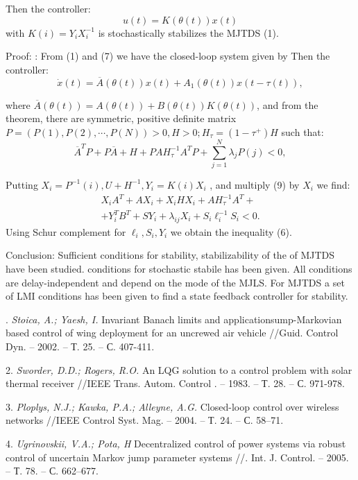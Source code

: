 Then the controller:
\begin{equation}
u(t)=K(\theta(t))x(t)
\end{equation}
with $K(i)=Y_i X_i^{-1}$ is stochastically stabilizes the MJTDS (1).

Proof: : From (1) and (7) we have the closed-loop system given by
Then the controller:
\begin{equation}
\dot{x}(t)=\overline A(\theta(t))x(t) +A_1(\theta(t))x(t-\tau(t)),
\end{equation}

where $\overline A(\theta(t))=A(\theta(t))+B(\theta(t))K(\theta(t))$,  and from the theorem, there are symmetric, positive definite matrix $P=(P(1),P(2),\cdots,P(N))>0 ,H>0; H_\tau =(1-\tau^+)H$ such that:
\begin{equation}
\overline A^TP +P\overline A+H+ PAH_\tau^{-1}A^TP+\sum_{j=1}^{N}\lambda_j P(j)<0,
\end{equation}

Putting  $X_i=P^{-1}(i), U+H^{-1}, Y_i=K(i)X_i$  , and multiply (9) by $X_i$  we find:
\begin{multline}
X_iA^T+AX_i+X_iHX_i+AH_\tau ^{-1} A^T+
\\+
Y_i^TB^T+SY_i+\lambda_{ij}X_i+S_i\ell_i^{-1}S_i<0
.
\end{multline}
Using Schur complement for $\ell_i , S_i , Y_i$ we obtain the inequality (6).

Conclusion:
 Sufficient conditions for stability, stabilizability of the of MJTDS have been studied.  conditions for stochastic stabile has been given. All conditions are delay-independent and depend on the mode of the MJLS.  For  MJTDS a set of LMI conditions has been given to find a state feedback controller for stability.

. {\it Stoica, A.; Yaesh, I. }
 Invariant Banach limits and applicationsump-Markovian based control of wing deployment for an uncrewed air vehicle //Guid. Control Dyn. – 2002. – Т. 25.  – С. 407-411.

2. {\it Sworder, D.D.; Rogers, R.O.  }
 An LQG solution to a control problem with solar thermal receiver //IEEE Trans. Autom. Control . – 1983. – Т. 28. – С. 971-978.

3. {\it Ploplys, N.J.; Kawka, P.A.; Alleyne, A.G. }
 Closed-loop control over wireless networks //IEEE Control Syst. Mag. – 2004. – Т. 24.  – С. 58–71.

4. {\it Ugrinovskii, V.A.; Pota, H }
 Decentralized control of power systems via robust control of uncertain Markov jump parameter systems //. Int. J. Control. – 2005. – Т. 78. – С. 662–677.

